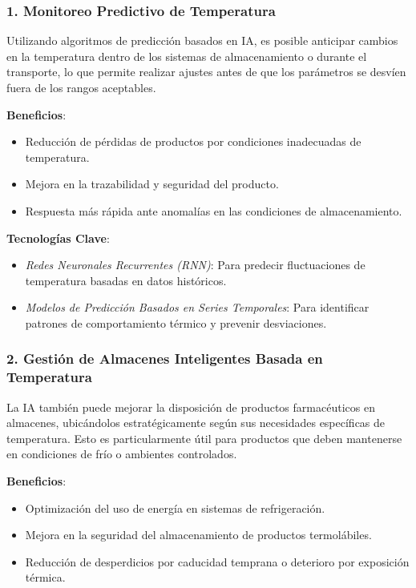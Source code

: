 \subsubsection{1. Monitoreo Predictivo de Temperatura}

Utilizando algoritmos de predicción basados en IA, es posible anticipar cambios en la temperatura dentro de los sistemas de almacenamiento o durante el transporte, lo que permite realizar ajustes antes de que los parámetros se desvíen fuera de los rangos aceptables.

\textbf{Beneficios}:
\begin{itemize}
    \item Reducción de pérdidas de productos por condiciones inadecuadas de temperatura.
    \item Mejora en la trazabilidad y seguridad del producto.
    \item Respuesta más rápida ante anomalías en las condiciones de almacenamiento.
\end{itemize}

\textbf{Tecnologías Clave}:
\begin{itemize}
    \item \textit{Redes Neuronales Recurrentes (RNN)}: Para predecir fluctuaciones de temperatura basadas en datos históricos.
    \item \textit{Modelos de Predicción Basados en Series Temporales}: Para identificar patrones de comportamiento térmico y prevenir desviaciones.
\end{itemize}

\subsubsection{2. Gestión de Almacenes Inteligentes Basada en Temperatura}

La IA también puede mejorar la disposición de productos farmacéuticos en almacenes, ubicándolos estratégicamente según sus necesidades específicas de temperatura. Esto es particularmente útil para productos que deben mantenerse en condiciones de frío o ambientes controlados.

\textbf{Beneficios}:
\begin{itemize}
    \item Optimización del uso de energía en sistemas de refrigeración.
    \item Mejora en la seguridad del almacenamiento de productos termolábiles.
    \item Reducción de desperdicios por caducidad temprana o deterioro por exposición térmica.
\end{itemize}

